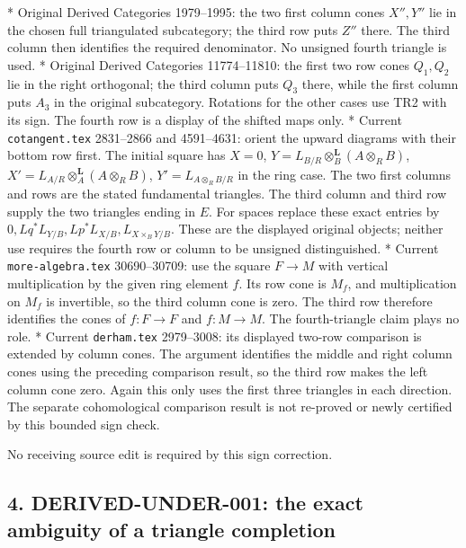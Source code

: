 * Original Derived Categories 1979–\allowbreak{}1995:\allowbreak{} the two first column cones \(X'',Y''\) lie in the chosen full triangulated subcategory; the third row puts \(Z''\) there. The third column then identifies the required denominator. No unsigned fourth triangle is used. * Original Derived Categories 11774–\allowbreak{}11810:\allowbreak{} the first two row cones \(Q_1,Q_2\) lie in the right orthogonal; the third column puts \(Q_3\) there,\allowbreak{} while the first column puts \(A_3\) in the original subcategory. Rotations for the other cases use TR2 with its sign. The fourth row is a display of the shifted maps only. * Current \texttt{cotangent.\allowbreak{}tex} 2831–\allowbreak{}2866 and 4591–\allowbreak{}4631:\allowbreak{} orient the upward diagrams with their bottom row first. The initial square has \(X=0\),\allowbreak{} \(Y=L_{B/R}\otimes_B^{\mathbf L}(A\otimes_RB)\),\allowbreak{} \(X'=L_{A/R}\otimes_A^{\mathbf L}(A\otimes_RB)\),\allowbreak{} \(Y'=L_{A\otimes_RB/R}\) in the ring case. The two first columns and rows are the stated fundamental triangles. The third column and third row supply the two triangles ending in \(E\). For spaces replace these exact entries by \(0,Lq^*L_{Y/B},Lp^*L_{X/B},
L_{X\times_BY/B}\). These are the displayed original objects; neither use requires the fourth row or column to be unsigned distinguished. * Current \texttt{more-\allowbreak{}algebra.\allowbreak{}tex} 30690–\allowbreak{}30709:\allowbreak{} use the square \(F\to M\) with vertical multiplication by the given ring element \(f\). Its row cone is \(M_f\),\allowbreak{} and multiplication on \(M_f\) is invertible,\allowbreak{} so the third column cone is zero. The third row therefore identifies the cones of \(f:F\to F\) and \(f:M\to M\). The fourth-triangle claim plays no role. * Current \texttt{derham.\allowbreak{}tex} 2979–\allowbreak{}3008:\allowbreak{} its displayed two-row comparison is extended by column cones. The argument identifies the middle and right column cones using the preceding comparison result,\allowbreak{} so the third row makes the left column cone zero. Again this only uses the first three triangles in each direction. The separate cohomological comparison result is not re-proved or newly certified by this bounded sign check.

No receiving source edit is required by this sign correction.

\subsection{\texorpdfstring{4. DERIVED-UNDER-001:\allowbreak{} the exact ambiguity of a triangle completion}{4.  the exact ambiguity of a triangle completion}}\label{proofs-0001-1140-derived-under-001-the-exact-ambiguity-of-a-triangle-completion}

